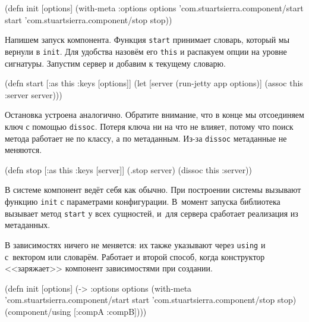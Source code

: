 \else

\begin{english}
  \begin{clojure}
(defn init [options]
  (with-meta {:options options}
    {'com.stuartsierra.component/start start
     'com.stuartsierra.component/stop stop}))
  \end{clojure}
\end{english}

\fi

Напишем запуск компонента. Функция \verb|start| принимает словарь, который мы
вернули в \verb|init|. Для удобства назовём его \verb|this| и распакуем опции на
уровне сигнатуры. Запустим сервер и добавим к текущему словарю.

\begin{english}
  \begin{clojure}
(defn start
  [{:as this :keys [options]}]
  (let [server (run-jetty app options)]
    (assoc this :server server)))
  \end{clojure}
\end{english}

Остановка устроена аналогично. Обратите внимание, что в конце мы отсоединяем
ключ с помощью \verb|dissoc|. Потеря ключа ни на что не влияет, потому что поиск
метода работает не по классу, а по метаданным. Из-за \verb|dissoc| метаданные не
меняются.

\begin{english}
  \begin{clojure}
(defn stop
  [{:as this :keys [server]}]
  (.stop server)
  (dissoc this :server))
  \end{clojure}
\end{english}

В системе компонент ведёт себя как обычно. При построении системы вызывают
функцию \verb|init| с параметрами конфигурации. В~момент запуска библиотека
вызывает метод \verb|start| у всех сущностей, и~для сервера сработает
реализация из метаданных.

В зависимостях ничего не меняется: их также указывают через \verb|using| и с~вектором
или словарём. Работает и второй способ, когда конструктор <<заряжает>>
компонент зависимостями при создании.

\ifx\DEVICETYPE\MOBILE

\begin{english}
  \begin{clojure}
(defn init [options]
  (->
    {:options options}
    (with-meta
     {'com.stuartsierra.component/start
      start
      'com.stuartsierra.component/stop
      stop})
    (component/using [:compA :compB])))
  \end{clojure}
\end{english}

